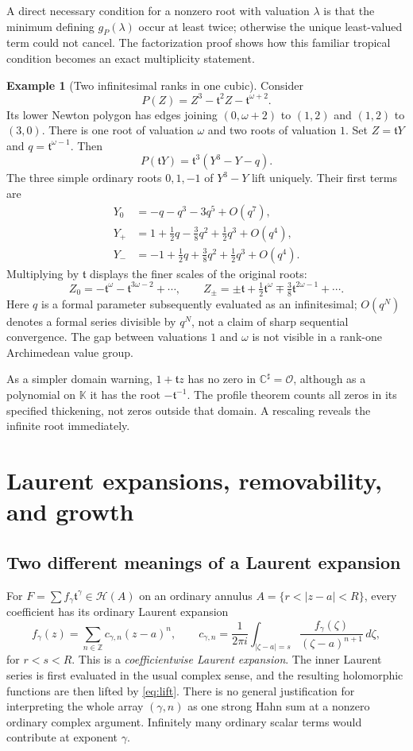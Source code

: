 \documentclass[11pt,a4paper]{article}
\numberwithin{equation}{section}
\theoremstyle{definition}
\newtheorem{example}[theorem]{Example}
\newcommand{\K}{\mathbb K}
\newcommand{\C}{\mathbb C}
\newcommand{\Z}{\mathbb Z}
\newcommand{\tmon}{\mathfrak t}
\newcommand{\OO}{\mathcal O}
\newcommand{\HH}{\mathscr H}
\begin{document}
A direct necessary condition for a nonzero root with valuation $\lambda$ is
that the minimum defining $g_P(\lambda)$ occur at least twice; otherwise the
unique least-valued term could not cancel. The factorization proof shows how
this familiar tropical condition becomes an exact multiplicity statement.

\begin{example}[Two infinitesimal ranks in one cubic]\label{ex:cubic}
Consider
\[
 P(Z)=Z^3-\tmon^2 Z-\tmon^{\omega+2}.
\]
Its lower Newton polygon has edges joining
$(0,\omega+2)$ to $(1,2)$ and $(1,2)$ to $(3,0)$.
There is one root of valuation $\omega$ and two roots of valuation $1$.
Set $Z=\tmon Y$ and $q=\tmon^{\omega-1}$. Then
\[
 P(\tmon Y)=\tmon^3(Y^3-Y-q).
\]
The three simple ordinary roots $0,1,-1$ of $Y^3-Y$ lift uniquely. Their first
terms are
\begin{align*}
 Y_0&=-q-q^3-3q^5+O(q^7),\\
 Y_+&=1+\tfrac12q-\tfrac38q^2+\tfrac12q^3+O(q^4),\\
 Y_-&=-1+\tfrac12q+\tfrac38q^2+\tfrac12q^3+O(q^4).
\end{align*}
Multiplying by $\tmon$ displays the finer scales of the original roots:
\[
 Z_0=-\tmon^\omega-\tmon^{3\omega-2}+\cdots,\qquad
 Z_\pm=\pm\tmon+\tfrac12\tmon^\omega
          \mp\tfrac38\tmon^{2\omega-1}+\cdots.
\]
Here $q$ is a formal parameter subsequently evaluated as an infinitesimal;
$O(q^N)$ denotes a formal series divisible by $q^N$, not a claim of sharp
sequential convergence. The gap between valuations $1$ and $\omega$ is
not visible in a rank-one Archimedean value group.
\end{example}

As a simpler domain warning, $1+\tmon z$ has no zero in $\C^\sharp=\OO$,
although as a polynomial on $\K$ it has the root $-\tmon^{-1}$.
The profile theorem counts all zeros in its specified thickening, not zeros
outside that domain. A rescaling reveals the infinite root immediately.

\section{Laurent expansions, removability, and growth}

\subsection{Two different meanings of a Laurent expansion}

For $F=\sum f_\gamma\tmon^\gamma\in\HH(A)$ on an ordinary annulus
$A=\{r<|z-a|<R\}$, every coefficient has its ordinary Laurent expansion
\[
 f_\gamma(z)=\sum_{n\in\Z}c_{\gamma,n}(z-a)^n,
 \qquad
 c_{\gamma,n}=\frac1{2\pi i}\int_{|\zeta-a|=s}
       \frac{f_\gamma(\zeta)}{(\zeta-a)^{n+1}}\,d\zeta,
\]
for $r<s<R$. This is a \emph{coefficientwise Laurent expansion}.
The inner Laurent series is first evaluated in the usual complex sense,
and the resulting holomorphic functions are then lifted by
\eqref{eq:lift}. There is no general justification for interpreting the
whole array $(\gamma,n)$ as one strong Hahn sum at a nonzero ordinary
complex argument. Infinitely many ordinary scalar terms would contribute
at exponent $\gamma$.
\end{document}
